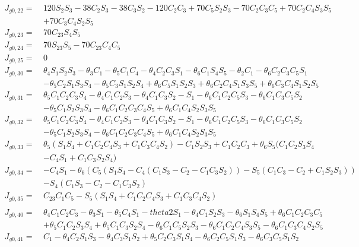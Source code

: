 \documentclass[12pt]{article}
\begin{document}
\begin{CJK}{UTF8}{bsmi}
\begin{equation*}
\begin{split}
J_{g0,22} =\  &120S_2S_3 - 38C_2S_3 - 38C_3S_2 - 120C_2C_3 + 70C_5S_2S_3 - 70C_2C_3C_5 + 70C_2C_4S_3S_5\\
		 	  &+ 70C_3C_4S_2S_5\\
J_{g0,23} =\  &70C_{23}S_4S_5\\
J_{g0,24} =\  &70S_{23}S_5 - 70C_{23}C_4C_5\\
J_{g0,25} =\  &0\\
J_{g0,30} =\  &\theta _4S_1S_2S_3 - \theta _3C_1 - \theta _5C_1C_4 - \theta _4C_2C_3S_1 - \theta _6C_1S_4S_5 - \theta _2C_1 - \theta _6C_2C_3C_5S_1\\
		 	  &- \theta _5C_2S_1S_3S_4 - \theta _5C_3S_1S_2S_4 + \theta _6C_5S_1S_2S_3 + \theta _6C_2C_4S_1S_3S_5 + \theta _6C_3C_4S_1S_2S_5\\
J_{g0,31} =\  &\theta _5C_1C_2C_3S_4 - \theta _4C_1C_2S_3 - \theta _4C_1C_3S_2 - S_1 - \theta _6C_1C_2C_5S_3 - \theta _6C_1C_3C_5S_2\\
		 	  &- \theta _5C_1S_2S_3S_4 - \theta _6C_1C_2C_3C_4S_5 + \theta _6C_1C_4S_2S_3S_5\\
J_{g0,32} =\  &\theta _5C_1C_2C_3S_4 - \theta _4C_1C_2S_3 - \theta _4C_1C_3S_2 - S_1 - \theta _6C_1C_2C_5S_3 - \theta _6C_1C_3C_5S_2\\
			  &- \theta _5C_1S_2S_3S_4 - \theta _6C_1C_2C_3C_4S_5 + \theta _6C_1C_4S_2S_3S_5\\
J_{g0,33} =\  &\theta _5(S_1S_4 + C_1C_2C_4S_3 + C_1C_3C_4S_2) - C_1S_2S_3 + C_1C_2C_3 + \theta _6S_5(C_1C_2S_3S_4\\
			  &- C_4S_1 + C_1C_3S_2S_4)\\
J_{g0,34} =\  &- C_4S_1 - \theta _6(C_5(S_1S_4 - C_4(C_1S_3-C_2 - C_1C_3S_2)) - S_5(C_1C_3-C_2 + C_1S_2S_3))\\
			  &- S_4(C_1S_3-C_2 - C_1C_3S_2)\\
J_{g0,35} =\  &C_{23}C_1C_5 - S_5(S_1S_4 + C_1C_2C_4S_3 + C_1C_3C_4S_2)\\
\end{split}
\end{equation*}
\begin{equation*}
\begin{split}
J_{g0,40} =\  &\theta _4C_1C_2C_3 - \theta _3S_1 - \theta _5C_4S_1 - theta2S_1 - \theta _4C_1S_2S_3 - \theta _6S_1S_4S_5 + \theta _6C_1C_2C_3C_5\\
		 	  &+ \theta _5C_1C_2S_3S_4 + \theta _5C_1C_3S_2S_4 - \theta _6C_1C_5S_2S_3 - \theta _6C_1C_2C_4S_3S_5 - \theta _6C_1C_3C_4S_2S_5\\
J_{g0,41} =\  &C_1 - \theta _4C_2S_1S_3 - \theta _4C_3S_1S_2 + \theta _5C_2C_3S_1S_4 - \theta _6C_2C_5S_1S_3 - \theta _6C_3C_5S_1S_2 \\

\end{split}
\end{equation*}
\end{CJK}
\end{document}
